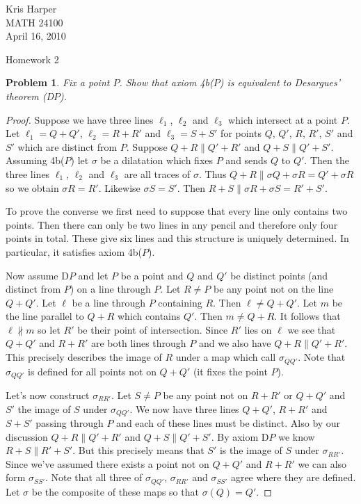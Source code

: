 \documentclass{article}
\newtheorem{problem}{Problem}
\begin{document}
\begin{flushright}
Kris Harper\\

MATH 24100\\

April 16, 2010
\end{flushright}

\begin{center}
Homework 2
\end{center}

\begin{problem}
Fix a point $P$. Show that axiom 4b($P$) is equivalent to Desargues' theorem (D$P$).
\end{problem}
\begin{proof}
Suppose we have three lines $\ell_1$, $\ell_2$ and $\ell_3$ which intersect at a point $P$. Let $\ell_1 = Q + Q'$, $\ell_2 = R + R'$ and $\ell_3 = S + S'$ for points $Q$, $Q'$, $R$, $R'$, $S'$ and $S'$ which are distinct from $P$. Suppose $Q + R \parallel Q' + R'$ and $Q + S \parallel Q' + S'$. Assuming 4b($P$) let $\sigma$ be a dilatation which fixes $P$ and sends $Q$ to $Q'$. Then the three lines $\ell_1$, $\ell_2$ and $\ell_3$ are all traces of $\sigma$. Thus $Q + R \parallel \sigma Q + \sigma R = Q' + \sigma R$ so we obtain $\sigma R = R'$. Likewise $\sigma S = S'$. Then $R + S \parallel \sigma R + \sigma S = R' + S'$.

To prove the converse we first need to suppose that every line only contains two points. Then there can only be two lines in any pencil and therefore only four points in total. These give six lines and this structure is uniquely determined. In particular, it satisfies axiom 4b($P$).

Now assume D$P$ and let $P$ be a point and $Q$ and $Q'$ be distinct points (and distinct from $P$) on a line through $P$. Let $R \neq P$ be any point not on the line $Q + Q'$. Let $\ell$ be a line through $P$ containing $R$. Then $\ell \neq Q + Q'$. Let $m$ be the line parallel to $Q + R$ which contains $Q'$. Then $m \neq Q + R$. It follows that $\ell \nparallel m$ so let $R'$ be their point of intersection. Since $R'$ lies on $\ell$ we see that $Q + Q'$ and $R + R'$ are both lines through $P$ and we also have $Q + R \parallel Q' + R'$. This precisely describes the image of $R$ under a map which call $\sigma_{QQ'}$. Note that $\sigma_{QQ'}$ is defined for all points not on $Q + Q'$ (it fixes the point $P$).

Let's now construct $\sigma_{RR'}$. Let $S \neq P$ be any point not on $R + R'$ or $Q + Q'$ and $S'$ the image of $S$ under $\sigma_{QQ'}$. We now have three lines $Q+Q'$, $R+R'$ and $S+S'$ passing through $P$ and each of these lines must be distinct. Also by our discussion $Q + R \parallel Q' + R'$ and $Q + S \parallel Q' + S'$. By axiom D$P$ we know $R + S \parallel R' + S'$. But this precisely means that $S'$ is the image of $S$ under $\sigma_{RR'}$. Since we've assumed there exists a point not on $Q + Q'$ and $R + R'$ we can also form $\sigma_{SS'}$. Note that all three of $\sigma_{QQ'}$, $\sigma_{RR'}$ and $\sigma_{SS'}$ agree where they are defined. Let $\sigma$ be the composite of these maps so that $\sigma(Q) = Q'$.


\end{proof}
\end{document}
